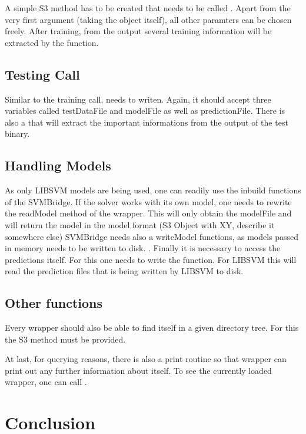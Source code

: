 \documentclass[article, shortnames]{jss}
\begin{document}
A simple S3 method has to be created that needs to be called
. Apart from the very
first argument (taking the object itself), all other paramters
can be chosen freely. After training, from the output several
training information will be extracted by the 
 function. 


\subsection{Testing Call}

Similar to the training call,  needs to
writen. Again, it should accept three variables called testDataFile and
modelFile as well as predictionFile. There is also a
 that will extract the important informations
from the output of the test binary.



\subsection{Handling Models}

As only LIBSVM models are being used, one can readily use the 
inbuild functions of the SVMBridge. If the solver works with its
own model, one needs to rewrite the readModel method of the wrapper.
This will only obtain the modelFile and will return the model
in the model format (S3 Object with XY, describe it somewhere else)
SVMBridge needs also a writeModel functions, as models passed in
memory needs to be written to disk. .
Finally it is necessary to access the predictions itself. For this one
needs to write the  function. For LIBSVM this
will read the prediction files that is being written by LIBSVM to disk.


\subsection{Other functions}

Every wrapper should also be able to find itself in a given directory tree.
For this the S3 method  must be provided.

At last, for querying reasons, there is also a print routine
so that wrapper can print out any further information about itself.
To see the currently loaded wrapper, one can call 
.


\section{Conclusion}
\end{document}
